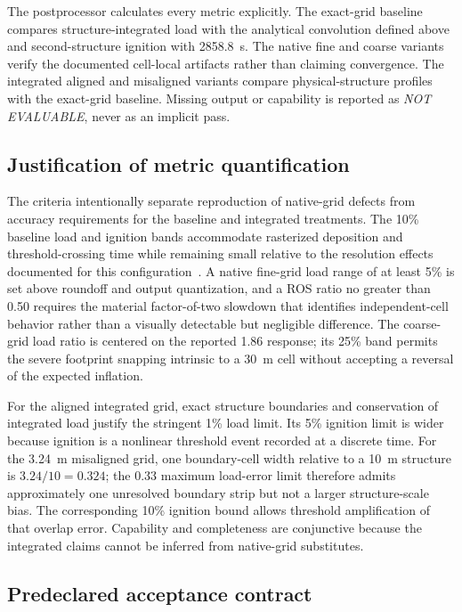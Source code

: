 The postprocessor calculates every metric explicitly. The exact-grid baseline
compares structure-integrated load with the analytical convolution defined
above and second-structure ignition with \SI{2858.8}{s}. The native fine and
coarse variants verify the documented cell-local artifacts rather than claiming
convergence. The integrated aligned and misaligned variants compare
physical-structure profiles with the exact-grid baseline. Missing output or
capability is reported as
\emph{NOT EVALUABLE}, never as an implicit pass.


\subsection{Justification of metric quantification}

The criteria intentionally separate reproduction of native-grid defects from
accuracy requirements for the baseline and integrated treatments.  The 10\%
baseline load and ignition bands accommodate rasterized deposition and
threshold-crossing time while remaining small relative to the resolution
effects documented for this configuration~\cite{Qin2025}.  A native fine-grid
load range of at least 5\% is set above roundoff and output quantization, and a
ROS ratio no greater than 0.50 requires the material factor-of-two slowdown
that identifies independent-cell behavior rather than a visually detectable
but negligible difference.  The coarse-grid load ratio is centered on the
reported 1.86 response; its 25\% band permits the severe footprint snapping
intrinsic to a \SI{30}{m} cell without accepting a reversal of the expected
inflation.

For the aligned integrated grid, exact structure boundaries and conservation
of integrated load justify the stringent 1\% load limit.  Its 5\% ignition
limit is wider because ignition is a nonlinear threshold event recorded at a
discrete time.  For the \SI{3.24}{m} misaligned grid, one boundary-cell width
relative to a \SI{10}{m} structure is \(3.24/10=0.324\); the 0.33 maximum
load-error limit therefore admits approximately one unresolved boundary strip
but not a larger structure-scale bias.  The corresponding 10\% ignition bound
allows threshold amplification of that overlap error.  Capability and
completeness are conjunctive because the integrated claims cannot be inferred
from native-grid substitutes.

\subsection{Predeclared acceptance contract}

